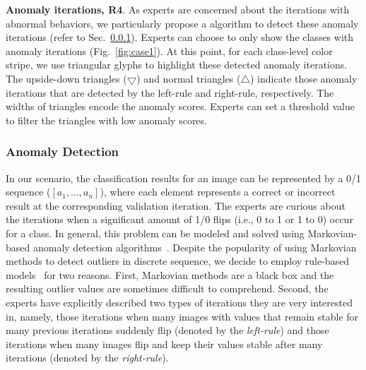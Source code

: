 \documentclass[format=acmsmall, review=false, screen=true]{acmart}
\newcommand{\ti}{\textcolor[rgb]{0,0,0}}
\begin{document}
\textbf{Anomaly iterations, R4}. \ti{As experts are concerned about the iterations with abnormal behaviors, we particularly propose a algorithm to detect these anomaly iterations (refer to Sec.~\ref{sec:anomaly}).
Experts can choose to only show the classes with anomaly iterations (Fig.~\ref{fig:case1}).
At this point, for each class-level color stripe, we use triangular glyphs to highlight these detected anomaly iterations.
The upside-down triangles ($\bigtriangledown$) and normal triangles ($\triangle$) indicate those anomaly iterations that are detected by the left-rule and right-rule, respectively.
The widths of triangles encode the anomaly scores.
Experts can set a threshold value to filter the triangles with low anomaly scores.}\subsubsection{Anomaly Detection}\label{sec:anomaly}%
In our scenario, the classification results for an image can be represented by a 0/1 sequence ($[a_1, ..., a_n]$), where each element represents a correct or incorrect result at the corresponding validation iteration.
The experts are curious about the iterations when a significant amount of 1/0 flips (i.e., 0 to 1 or 1 to 0) occur for a class.
In general, this problem can be modeled and solved using Markovian-based anomaly detection algorithms~\cite{aggarwal2015outlier}.
Despite the popularity of using Markovian methods to detect outliers in discrete sequence, we decide to employ rule-based models~\cite{aggarwal2015outlier} for two reasons.
First, Markovian methods are a black box and the resulting outlier values are sometimes difficult to comprehend. Second, the experts have explicitly described two types of iterations they are very interested in, namely, those iterations when many images with values that remain stable for many previous iterations suddenly flip (denoted by the \textit{left-rule}) and those iterations when many images flip and keep their values stable after many iterations (denoted by the \textit{right-rule}).
\end{document}
